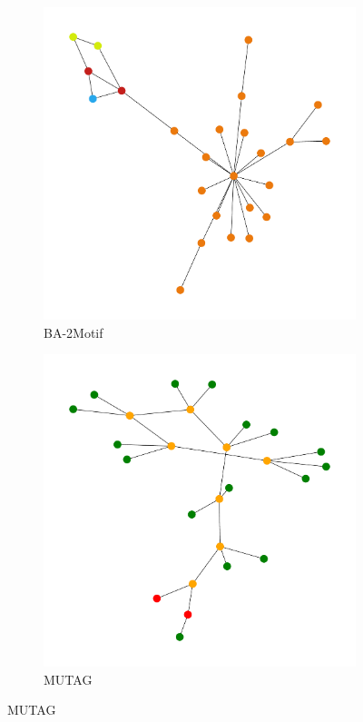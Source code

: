 \begin{figure}[H]
    \vspace{0.5cm}
    
    \begin{subfigure}[b]{0.4\textwidth}
        \includegraphics[width=\textwidth]{img/BA-2Motif-VIS-UNLABELED.pdf}
        \caption{BA-2Motif}
    \end{subfigure}
    \hfill
    \begin{subfigure}[b]{0.4\textwidth}
        \includegraphics[width=\textwidth]{img/MUTAG-VIS-LARGE-UNLABELED.pdf}
        \caption{MUTAG}
    \end{subfigure}


\end{figure}
